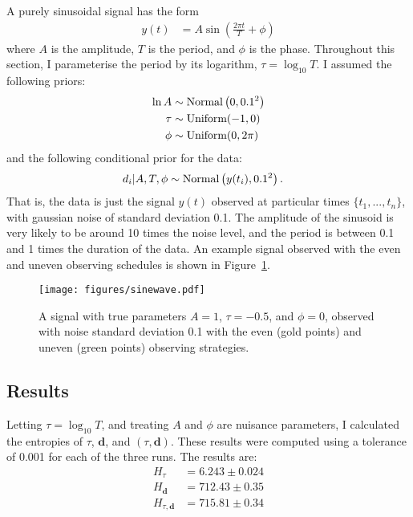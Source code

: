 \documentclass[entropy,article,accept,oneauthor,pdftex,10pt,a4paper]{mdpi}
\renewcommand{\d}{\boldsymbol{d}}
\begin{document}
A purely sinusoidal signal has the form
\begin{align}
y(t) &= A \sin \left(\frac{2\pi t}{T} + \phi\right)
\end{align}
where $A$ is the amplitude, $T$ is the period, and $\phi$ is the phase.
Throughout this section, I parameterise the period by its logarithm,
$\tau = \log_{10} T$. I assumed the following priors:
\begin{align}
\ln A   &\sim \textnormal{Normal}\left(0, 0.1^2\right)  \\
\tau    &\sim \textnormal{Uniform}(-1, 0)  \\
\phi    &\sim \textnormal{Uniform}(0, 2\pi)
\end{align}
and the following conditional prior for the data:
\begin{align}
d_i | A, T, \phi &\sim \textnormal{Normal}\left(y(t_i), 0.1^2\right).
\end{align}
That is, the data is just the signal $y(t)$ observed at particular times
$\{t_1, ..., t_n\}$, with gaussian noise of standard deviation 0.1.
The amplitude of the sinusoid is very likely to be around 10 times the
noise level, and the period is between 0.1 and 1 times the duration of
the data. An example signal observed with the even and uneven observing schedules
is shown in Figure~\ref{fig:sinewave}.

\begin{figure}[!ht]
\centering
\texttt{[image: figures/sinewave.pdf]}
\caption{A signal with true parameters $A=1$, $\tau=-0.5$, and
$\phi=0$, observed with noise standard deviation 0.1 with the
even (gold points) and uneven (green points) observing strategies.
\label{fig:sinewave}}
\end{figure}


\subsection{Results}

Letting $\tau = \log_{10} T$, and treating
$A$ and $\phi$ are nuisance parameters, I calculated the entropies
of $\tau$, $\d$, and $(\tau, \d)$.
These results were computed using a tolerance of 0.001 for each of the three
runs. The results are:
\begin{align}
H_{\tau}    &= 6.243  \pm 0.024 \\
H_{\d}      &= 712.43 \pm 0.35   \\
H_{\tau,\d} &= 715.81 \pm 0.34
\end{align}
\end{document}
